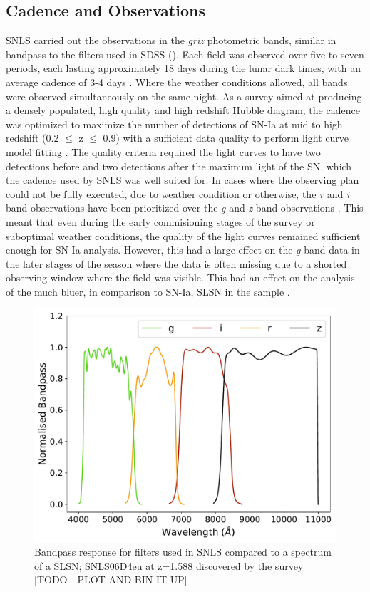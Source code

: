 \subsection{Cadence and Observations}
SNLS carried out the observations in the \textit{griz} photometric bands, similar in bandpass to the filters used in SDSS (). Each field was observed over five to seven periods, each lasting approximately 18 days during the lunar dark times, with an average cadence of 3-4 days \citep{Astier2006,Guy2010}. Where the weather conditions allowed, all bands were observed simultaneously on the same night. As a survey aimed at producing a densely populated, high quality and high redshift Hubble diagram, the cadence was optimized to maximize the number of detections of SN-Ia at mid to high redshift (0.2 $\leq$ z $\leq$ 0.9) with a sufficient data quality to perform light curve model fitting \citep{Pritchet2004}. The quality criteria required the light curves to have two detections before and two detections after the maximum light of the SN, which the cadence used by SNLS was well suited for. In cases where the observing plan could not be fully executed, due to weather condition or otherwise, the \textit{r} and \textit{i} band observations have been prioritized over the \textit{g} and \textit{z} band observations \citep{Guy2010}. This meant that even during the early commisioning stages of the survey or suboptimal weather conditions, the quality of the light curves remained sufficient enough for SN-Ia analysis. However, this had a large effect on the \textit{g}-band data in the later stages of the season where the data is often missing due to a shorted observing window where the field was visible. This had an effect on the analysis of the much bluer, in comparison to SN-Ia, SLSN in the sample \citep{Prajs2016}.

\begin{figure}
  \centering
  \includegraphics[width=\textwidth]{Figures/Chapter2/SNLS_filters.pdf}
    \caption{Bandpass response for filters used in SNLS compared to a spectrum of a SLSN; SNLS06D4eu at z=1.588 discovered by the survey [TODO - PLOT AND BIN IT UP]}
    \label{fig:SNLSFilters}
\end{figure}

